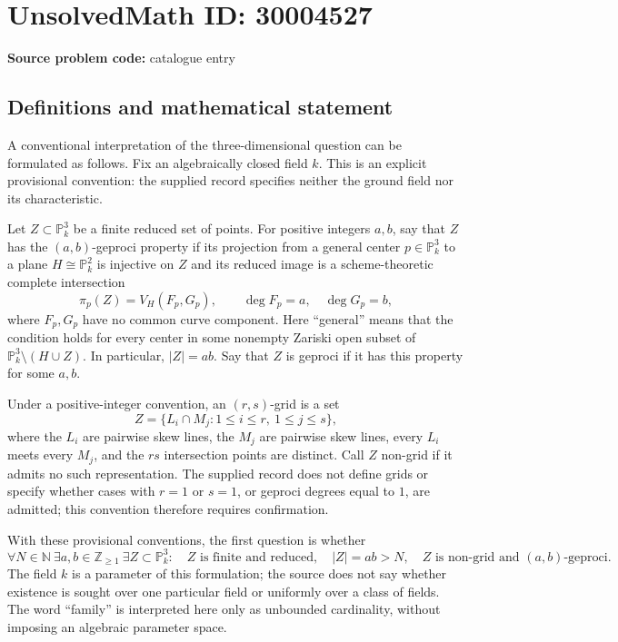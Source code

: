 \documentclass[11pt]{article}
\newcommand{\N}{\mathbb{N}}
\newcommand{\Z}{\mathbb{Z}}
\begin{document}
\section*{UnsolvedMath ID: 30004527}
\textbf{Source problem code:} catalogue entry
\subsection{Definitions and mathematical statement}
A conventional interpretation of the three-dimensional question can be formulated as follows. Fix an algebraically closed field \(k\). This is an explicit provisional convention: the supplied record specifies neither the ground field nor its characteristic.

Let \(Z\subset\mathbb{P}^{3}_{k}\) be a finite reduced set of points. For positive integers \(a,b\), say that \(Z\) has the \((a,b)\)-geproci property if its projection from a general center \(p\in\mathbb{P}^{3}_{k}\) to a plane \(H\cong\mathbb{P}^{2}_{k}\) is injective on \(Z\) and its reduced image is a scheme-theoretic complete intersection
\[
\pi_p(Z)=V_H(F_p,G_p),\qquad \deg F_p=a,\quad \deg G_p=b,
\]
where \(F_p,G_p\) have no common curve component. Here ``general'' means that the condition holds for every center in some nonempty Zariski open subset of \(\mathbb{P}^{3}_{k}\setminus(H\cup Z)\). In particular, \(|Z|=ab\). Say that \(Z\) is geproci if it has this property for some \(a,b\).

Under a positive-integer convention, an \((r,s)\)-grid is a set
\[
Z=\{L_i\cap M_j:1\leq i\leq r,\ 1\leq j\leq s\},
\]
where the \(L_i\) are pairwise skew lines, the \(M_j\) are pairwise skew lines, every \(L_i\) meets every \(M_j\), and the \(rs\) intersection points are distinct. Call \(Z\) non-grid if it admits no such representation. The supplied record does not define grids or specify whether cases with \(r=1\) or \(s=1\), or geproci degrees equal to \(1\), are admitted; this convention therefore requires confirmation.

With these provisional conventions, the first question is whether
\[
\forall N\in\N\ \exists a,b\in\Z_{\geq1}\ \exists Z\subset\mathbb{P}^{3}_{k}:
\quad Z\text{ is finite and reduced},\quad
|Z|=ab>N,\quad
Z\text{ is non-grid and }(a,b)\text{-geproci}.
\]
The field \(k\) is a parameter of this formulation; the source does not say whether existence is sought over one particular field or uniformly over a class of fields. The word ``family'' is interpreted here only as unbounded cardinality, without imposing an algebraic parameter space.
\end{document}
